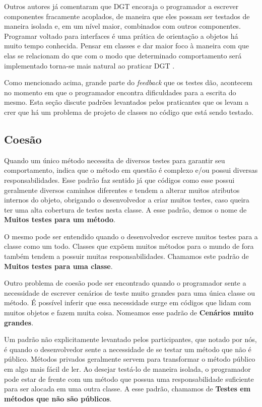 Outros autores já comentaram que 
DGT encoraja o programador a escrever componentes fracamente acoplados, de
maneira que eles possam ser testados de maneira isolada e, em um nível maior,
combinados com outros componentes.
Programar voltado para interfaces é uma prática de orientação a objetos há muito
tempo conhecida. Pensar em classes e dar maior foco à maneira com que
elas se relacionam do que com o modo que determinado comportamento será implementado
torna-se mais natural ao praticar DGT \cite{GOOS}. 

Como mencionado acima, grande parte do \textit{feedback} que os testes
dão, acontecem no momento em que o programador encontra dificuldades para a
escrita do mesmo. Esta seção discute padrões levantados pelos praticantes
que os levam a crer que há um problema de projeto de classes no código
que está sendo testado.

\subsection{Coesão}

Quando um único método necessita de diversos testes para garantir seu comportamento,
indica que o método em questão é complexo e/ou possui diversas responsabilidades.
Esse padrão faz sentido já que códigos como esse possui geralmente diversos caminhos
diferentes e tendem a alterar muitos atributos internos do objeto, obrigando o desenvolvedor
a criar muitos testes, caso queira ter uma alta cobertura de testes nesta classe.
A esse padrão, demos o nome de \textbf{Muitos testes para um método}.

O mesmo pode ser entendido quando o desenvolvedor escreve muitos testes para a 
classe como um todo. Classes que expõem muitos métodos para o mundo de fora
também tendem a possuir muitas responsabilidades. Chamamos este padrão
de \textbf{Muitos testes para uma classe}.

Outro problema de coesão pode ser encontrado quando o programador
sente a necessidade de escrever cenários de teste muito grandes para uma
única classe ou método. É possível inferir que essa necessidade surge 
em códigos que lidam com muitos objetos e fazem muita coisa. Nomeamos
esse padrão de \textbf{Cenários muito grandes}.

Um padrão não explicitamente levantado pelos participantes, que notado
por nós, é quando o desenvolvedor sente a necessidade de se testar
um método que não é público. Métodos privados geralmente servem para 
transformar o método público em algo mais fácil de ler. Ao desejar
testá-lo de maneira isolada, o programador pode estar de frente com
um método que possua uma responsabilidade suficiente para ser
alocada em uma outra classe. A esse padrão, chamamos de 
\textbf{Testes em métodos que não são públicos}.

